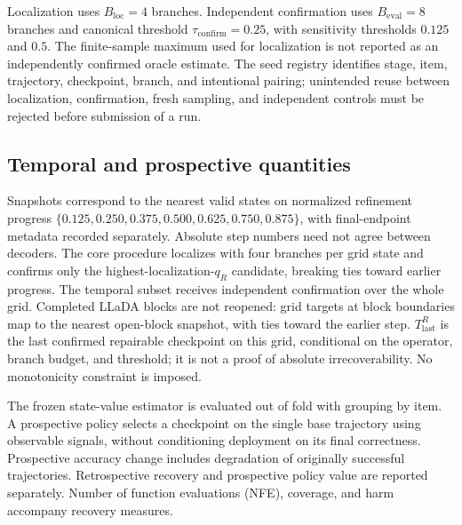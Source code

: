Localization uses $B_{\mathrm{loc}}=4$ branches. Independent confirmation uses
$B_{\mathrm{eval}}=8$ branches and canonical threshold
$\tau_{\mathrm{confirm}}=0.25$, with sensitivity thresholds $0.125$ and $0.5$.
The finite-sample maximum used for localization is not reported as an
independently confirmed oracle estimate. The seed registry identifies stage,
item, trajectory, checkpoint, branch, and intentional pairing; unintended reuse
between localization, confirmation, fresh sampling, and independent controls
must be rejected before submission of a run.

\subsection{Temporal and prospective quantities}
Snapshots correspond to the nearest valid states on normalized refinement
progress $\{0.125,0.250,0.375,0.500,0.625,0.750,0.875\}$, with final-endpoint
metadata recorded separately. Absolute step numbers need not agree between
decoders. The core procedure localizes with four branches per grid state and confirms
only the highest-localization-$q_R$ candidate, breaking ties toward earlier
progress. The temporal subset receives independent confirmation over the whole
grid. Completed LLaDA blocks are not reopened: grid targets at block boundaries
map to the nearest open-block snapshot, with ties toward the earlier step. $T_{\mathrm{last}}^R$ is the last confirmed repairable checkpoint on this
grid, conditional on the operator, branch budget, and threshold; it is not a
proof of absolute irrecoverability. No monotonicity constraint is imposed.

The frozen state-value estimator is evaluated out of fold with grouping by item.
A prospective policy selects a checkpoint on the single base trajectory using
observable signals, without conditioning deployment on its final correctness.
Prospective accuracy change includes degradation of originally successful
trajectories. Retrospective recovery and prospective policy value are reported
separately. Number of function evaluations (NFE), coverage, and harm accompany
recovery measures.
